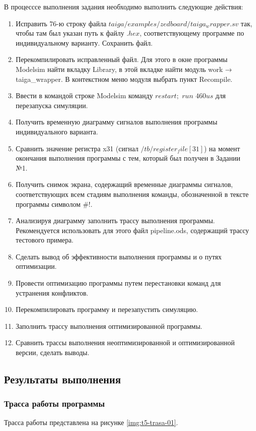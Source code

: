 В процесссе выполнения задания необходимо выполнить следующие действия:
\begin{enumerate}
	\item Исправить 76-ю строку файла $taiga/examples/zedboard/taiga_wrapper.sv$ так, чтобы там был указан путь к файлу $.hex$, соответствующему программе по индивидуальному варианту. Сохранить файл.
	\item Перекомпилировать исправленный файл. Для этого в окне программы Modelsim найти вкладку Library, в этой вкладке найти модуль work → taiga\_wrapper. В контекстном меню модуля выбрать пункт Recompile.
	\item Ввести в командой строке Modelsim команду $restart;$ $run$ $460us$ для перезапуска симуляции.
	\item Получить временную диаграмму сигналов выполнения программы индивидуального варианта.
	\item Сравнить значение регистра x31 (сигнал $/tb/register_file[31]$) на момент окончания выполнения программы с тем, который был получен в Задании №1.
	\item Получить снимок экрана, содержащий временные диаграммы сигналов, соответствующих всем стадиям выполнения команды, обозначенной в тексте программы символом \#!.
	\item Анализируя диаграмму заполнить трассу выполнения программы. Рекомендуется использовать для этого файл pipeline.ods, содержащий трассу тестового примера.
	\item Сделать вывод об эффективности выполнения программы и о путях оптимизации.
	\item Провести оптимизацию программы путем перестановки команд для устранения конфликтов.
	\item Перекомпилировать программу и перезапустить симуляцию.
	\item Заполнить трассу выполнения оптимизированной программы.
	\item Сравнить трассы выполнения неоптимизированной и оптимизированной версии, сделать выводы.
\end{enumerate}

\subsection*{Результаты выполнения}

\subsubsection*{Трасса работы программы}
Трасса работы представлена на рисунке \ref{img:t5-trasa-01}.

